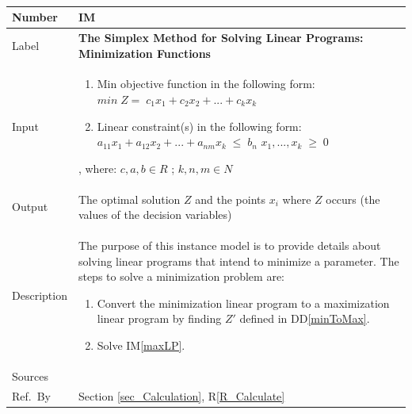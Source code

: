 \documentclass[12pt]{article}
\newcommand{\colAwidth}{0.13\textwidth}
\newcommand{\colBwidth}{0.82\textwidth}
\newcommand{\ddref}[1]{DD\ref{#1}}
\newcounter{instnum} %
\newcommand{\iref}[1]{IM\ref{#1}}
\newcommand{\rref}[1]{R\ref{#1}}
\begin{document}
~\newline

\noindent
\begin{minipage}{\textwidth}
	\renewcommand*{\arraystretch}{1.5}
	\begin{tabular}{| p{\colAwidth} | p{\colBwidth}|}
		\hline
		\rowcolor[gray]{0.9}
		Number& IM{instnum}\theinstnum \label{minLP}\\
		\hline
		Label& \bf The Simplex Method for Solving Linear Programs: Minimization 
		Functions\\
		\hline
		Input& 
		\begin{enumerate}
			\item Min objective function in the following form: 
			\newline$min\;Z=\;c_{1}x_1 + c_{2}x_2 + ... + c_{k}x_k$
			
			\item Linear constraint(s) in the following form: 
			\newline$a_{11}x_1 + a_{12}x_2 + ... + a_{nm}x_k\;{\leq}\;b_n$
			\newline$x_1, ..., x_k\;{\geq}\;0$
		\end{enumerate} , where: $c, a, b \in R$ ; $k, n, m \in N$\\
		\hline
		Output& The optimal solution $Z$ and the points $x_i$ where $Z$ occurs 
		(the values of the decision variables)\\
		\hline
		Description& The purpose of this instance model is to provide details 
		about solving linear programs that intend to minimize a parameter. The 
		steps to solve a minimization problem are:
		\begin{enumerate}
			\item Convert the minimization linear program to a maximization 
			linear program by finding $Z'$ defined in \ddref{minToMax}.
			
			\item Solve \iref{maxLP}.
		\end{enumerate}
		\\
		\hline
		Sources& \cite{lp-defs}\\
		\hline
		Ref.\ By & Section \ref{sec_Calculation}, \rref{R_Calculate} \\
		\hline
	\end{tabular}
\end{minipage}\\

\end{document}
